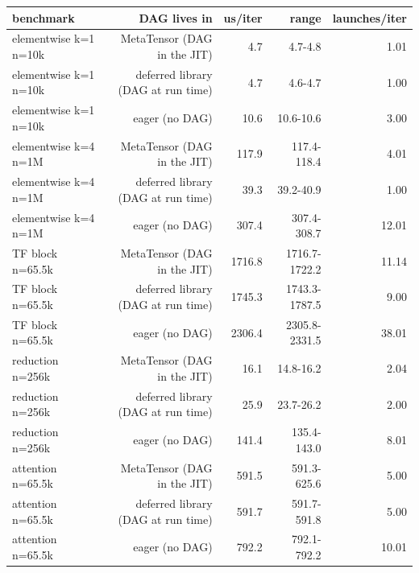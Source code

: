 \begin{tabular}{lrrrr}
\toprule
benchmark & DAG lives in & us/iter & range & launches/iter \\
\midrule
elementwise k=1 n=10k & MetaTensor (DAG in the JIT) & 4.7 & 4.7-4.8 & 1.01 \\
elementwise k=1 n=10k & deferred library (DAG at run time) & 4.7 & 4.6-4.7 & 1.00 \\
elementwise k=1 n=10k & eager (no DAG) & 10.6 & 10.6-10.6 & 3.00 \\
elementwise k=4 n=1M & MetaTensor (DAG in the JIT) & 117.9 & 117.4-118.4 & 4.01 \\
elementwise k=4 n=1M & deferred library (DAG at run time) & 39.3 & 39.2-40.9 & 1.00 \\
elementwise k=4 n=1M & eager (no DAG) & 307.4 & 307.4-308.7 & 12.01 \\
TF block n=65.5k & MetaTensor (DAG in the JIT) & 1716.8 & 1716.7-1722.2 & 11.14 \\
TF block n=65.5k & deferred library (DAG at run time) & 1745.3 & 1743.3-1787.5 & 9.00 \\
TF block n=65.5k & eager (no DAG) & 2306.4 & 2305.8-2331.5 & 38.01 \\
reduction n=256k & MetaTensor (DAG in the JIT) & 16.1 & 14.8-16.2 & 2.04 \\
reduction n=256k & deferred library (DAG at run time) & 25.9 & 23.7-26.2 & 2.00 \\
reduction n=256k & eager (no DAG) & 141.4 & 135.4-143.0 & 8.01 \\
attention n=65.5k & MetaTensor (DAG in the JIT) & 591.5 & 591.3-625.6 & 5.00 \\
attention n=65.5k & deferred library (DAG at run time) & 591.7 & 591.7-591.8 & 5.00 \\
attention n=65.5k & eager (no DAG) & 792.2 & 792.1-792.2 & 10.01 \\
\bottomrule
\end{tabular}
